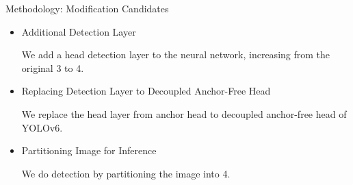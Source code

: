 \documentclass[final,hyperref={pdfpagelabels=false}]{beamer}
\begin{document}
\begin{frame}[t]
\begin{columns}[t]
\begin{column}{.465\textwidth}
\begin{block}{Methodology: Modification Candidates}
\begin{itemize}
  
  \item {Additional Detection Layer}

  We add a head detection layer to the neural network, increasing from the original 3 to 4.

  \item {Replacing Detection Layer to Decoupled Anchor-Free Head}

  We replace the head layer from anchor head to decoupled anchor-free head of YOLOv6.
  
  \item {Partitioning Image for Inference}

  We do detection by partitioning the image into 4.
  
\end{itemize}
\end{block}




\end{column}
\end{columns}
\end{frame}
\end{document}
